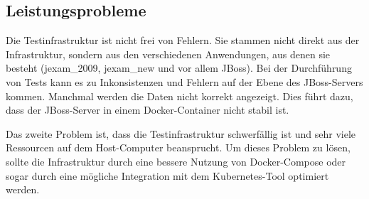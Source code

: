 \subsection{Leistungsprobleme}

Die Testinfrastruktur ist nicht frei von Fehlern. Sie stammen nicht
direkt aus der Infrastruktur, sondern aus den verschiedenen
Anwendungen, aus denen sie besteht (\gls{jexam_2009}, \gls{jexam_new} und vor
allem JBoss). Bei der Durchführung von Tests kann es zu Inkonsistenzen
und Fehlern auf der Ebene des JBoss-Servers kommen. Manchmal werden
die Daten nicht korrekt angezeigt. Dies führt dazu, dass der
JBoss-Server in einem Docker-Container nicht stabil ist.

Das zweite Problem ist, dass die Testinfrastruktur schwerfällig ist
und sehr viele Ressourcen auf dem Host-Computer beansprucht. Um dieses
Problem zu lösen, sollte die Infrastruktur durch eine bessere Nutzung
von Docker-Compose oder sogar durch eine mögliche Integration mit dem
Kubernetes-Tool optimiert werden.

